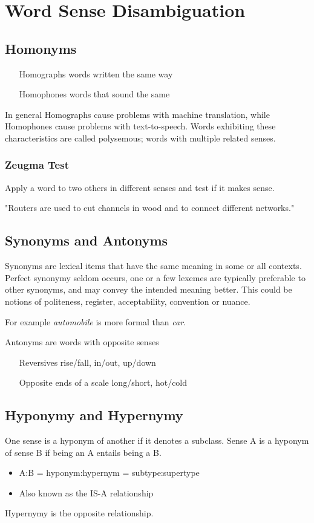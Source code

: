 \documentclass[11pt]{article}
\begin{document}
\section{Word Sense Disambiguation}

\subsection{Homonyms}
\begin{itemize}[leftmargin=*, labelindent=2cm, labelsep=1cm]
	\item[Homographs] words written the same way
	\item[Homophones] words that sound the same
\end{itemize}
In general Homographs cause problems with machine translation, while Homophones cause problems with text-to-speech. Words exhibiting these characteristics are called polysemous; words with multiple related senses.

\subsubsection{Zeugma Test}
Apply a word to two others in different senses and test if it makes sense.

"Routers are used to cut channels in wood and to connect different networks."

\subsection{Synonyms and Antonyms}
Synonyms are lexical items that have the same meaning in some or all contexts. Perfect synonymy seldom occurs, one or a few lexemes are typically preferable to other synonyms, and may convey the intended meaning better. This could be notions of politeness, register, acceptability, convention or nuance.

For example \textit{automobile} is more formal than \textit{car}.

\vspace{1em}
\noindent
Antonyms are words with opposite senses
\begin{itemize}[leftmargin=*, labelindent=4cm, labelsep=1cm]
	\item[Reversives] rise/fall, in/out, up/down
	\item[Opposite ends of a scale] long/short, hot/cold
\end{itemize}

\subsection{Hyponymy and Hypernymy}
One sense is a hyponym of another if it denotes a subclass. Sense A is a hyponym of sense B if being an A entails being a B.
\begin{itemize}[label=-]
	\item A:B = hyponym:hypernym = subtype:supertype
	\item Also known as the IS-A relationship
\end{itemize}
Hypernymy is the opposite relationship.
\end{document}

